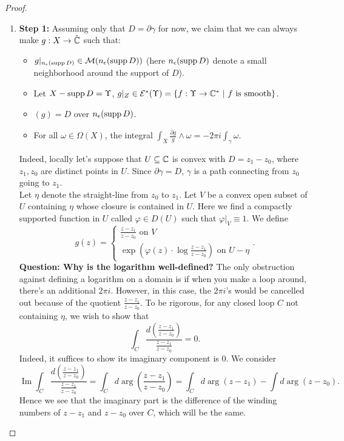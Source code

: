 \documentclass{article}
\begin{document}
{\begin{proof}
    \begin{enumerate}
        \item \textbf{Step 1:} Assuming only that $D = \partial \gamma$ for now, we claim that we can always make $g: X \to \hat{\mathbb{C}}$ such that:
        \begin{itemize}
            \item $g|_{n_\epsilon(\operatorname{supp} D)} \in \mathcal{M}(n_\epsilon(\operatorname{supp} D))$ (here $n_\epsilon(\operatorname{supp} D)$ denote a small neighborhood around the support of $D$).
            \item Let $X - \operatorname{supp} D = \Upsilon$,  $g|_{Z} \in \mathcal{E}^*(\Upsilon) = \{f: \Upsilon \to \mathbb{C}^*\ |\ f \text{ is smooth}\}$.
            \item $(g) = D$ over $n_\epsilon(\operatorname{supp} D)$.
            \item For all $\omega \in \Omega(X)$, the integral $\int_X \frac{\overline{\partial} g}{g} \wedge \omega = - 2\pi i \int_{\gamma} \omega$.
        \end{itemize}
        Indeed, locally let's suppose that $U \subseteq \mathbb{C}$ is convex with $D = z_1 - z_0$, where $z_1, z_0$ are distinct points in $U$. Since $\partial \gamma = D$, $\gamma$ is a path connecting from $z_0$ going to $z_1$.\\
        
        Let $\eta$ denote the straight-line from $z_0$ to $z_1$. Let $V$ be a convex open subset of $U$ containing $\eta$ whose closure is contained in $U$. Here we find a compactly supported function in $U$ called $\varphi \in D(U)$ such that $\varphi|_V \equiv 1$. We define
        \[g(z) = \begin{cases}
            \frac{z - z_1}{z - z_0} \text{ on $V$}\\
            \exp(\varphi(z) \cdot \log \frac{z - z_1}{z - z_0}) \text{ on $U - \eta$}
        \end{cases}.\]
        \textbf{Question: Why is the logarithm well-defined?} The only obstruction against defining a logarithm on a domain is if when you make a loop around, there's an additional $2\pi i$. However, in this case, the $2\pi i$'s would be cancelled out because of the quotient $\frac{z - z_1}{z - z_0}$. To be rigorous, for any closed loop $C$ not containing $\eta$, we wish to show that 
        \[\int_C \frac{d(\frac{z - z_1}{z - z_0})}{\frac{z- z_1}{z - z_0}} = 0.\]
        Indeed, it suffices to show its imaginary component is $0$. We consider
        \[\operatorname{Im} \int_C \frac{d(\frac{z - z_1}{z - z_0})}{\frac{z- z_1}{z - z_0}} = \int_C d \arg(\frac{z - z_1}{z - z_0}) = \int_C d \arg (z - z_1) - \int d \arg (z - z_0). \]
        Hence we see that the imaginary part is the difference of the winding numbers of $z - z_1$ and $z - z_0$ over $C$, which will be the same.\\


\end{enumerate}
\end{proof}}
\end{document}
